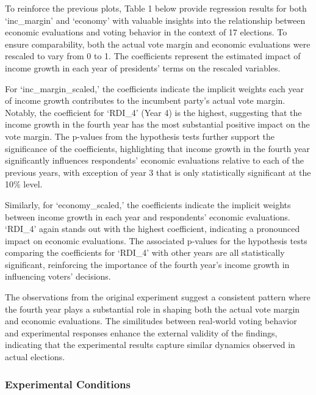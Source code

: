 \documentclass[
]{article}
\begin{document}
To reinforce the previous plots, Table 1 below provide regression
results for both `inc\_margin' and `economy' with valuable insights into
the relationship between economic evaluations and voting behavior in the
context of 17 elections. To ensure comparability, both the actual vote
margin and economic evaluations were rescaled to vary from 0 to 1. The
coefficients represent the estimated impact of income growth in each
year of presidents' terms on the rescaled variables.

For `inc\_margin\_scaled,' the coefficients indicate the implicit
weights each year of income growth contributes to the incumbent party's
actual vote margin. Notably, the coefficient for `RDI\_4' (Year 4) is
the highest, suggesting that the income growth in the fourth year has
the most substantial positive impact on the vote margin. The p-values
from the hypothesis tests further support the significance of the
coefficients, highlighting that income growth in the fourth year
significantly influences respondents' economic evaluations relative to
each of the previous years, with exception of year 3 that is only
statistically significant at the 10\% level.

Similarly, for `economy\_scaled,' the coefficients indicate the implicit
weights between income growth in each year and respondents' economic
evaluations. `RDI\_4' again stands out with the highest coefficient,
indicating a pronounced impact on economic evaluations. The associated
p-values for the hypothesis tests comparing the coefficients for
`RDI\_4' with other years are all statistically significant, reinforcing
the importance of the fourth year's income growth in influencing voters'
decisions.

\begin{center}
  
\end{center}

The observations from the original experiment suggest a consistent
pattern where the fourth year plays a substantial role in shaping both
the actual vote margin and economic evaluations. The similitudes between
real-world voting behavior and experimental responses enhance the
external validity of the findings, indicating that the experimental
results capture similar dynamics observed in actual elections.

\hypertarget{experimental-conditions}{%
\subsubsection{Experimental Conditions}\label{experimental-conditions}}
\end{document}

